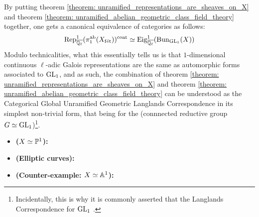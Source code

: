         \begin{remark} \label{remark: unramified_abelian_geometric_class_field_theory_explanation}
            By putting theorem \ref{theorem: unramified_representations_are_sheaves_on_X} and theorem \ref{theorem: unramified_abelian_geometric_class_field_theory} together, one gets a canonical equivalence of categories as follows:
                $$\Rep_{\overline{\Q_{\ell}}}^1(\pi_1^{\ab}(X_{\fet}))^{\cont} \cong \Eig^1_{\overline{\Q_{\ell}}}(\Bun_{\GL_1}(X))$$
            Modulo technicalities, what this essentially tells us is that $1$-dimensional continuous $\ell$-adic Galois representations are the same as automorphic forms associated to $\GL_1$, and as such, the combination of theorem \ref{theorem: unramified_representations_are_sheaves_on_X} and theorem \ref{theorem: unramified_abelian_geometric_class_field_theory} can be understood as the Categorical Global Unramified Geometric Langlands Correspondence in its simplest non-trivial form, that being for the (connnected reductive group $G \cong \GL_1$)\footnote{Incidentally, this is why it is commonly asserted that the Langlands Correspondence for $\GL_1$ .}. 
        \end{remark}
        \begin{example} \label{example: geometric_reciprocity}
            \noindent
            \begin{itemize}
                \item \textbf{($X \cong \P^1$):}
                \item \textbf{(Elliptic curves):}
                \item \textbf{(Counter-example: $X \cong \A^1$):}
            \end{itemize}
        \end{example}
        
        \begin{remark}
            
        \end{remark}